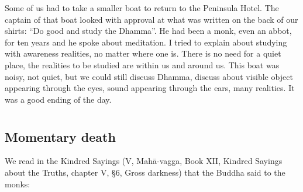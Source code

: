 Some of us had to take a smaller boat to return to the Peninsula Hotel.
The captain of that boat looked with approval at what was written on the
back of our shirts: ``Do good and study the Dhamma''. He had been a
monk, even an abbot, for ten years and he spoke about meditation. I
tried to explain about studying with awareness realities, no matter
where one is. There is no need for a quiet place, the realities to be
studied are within us and around us. This boat was noisy, not quiet, but
we could still discuss Dhamma, discuss about visible object appearing
through the eyes, sound appearing through the ears, many realities. It
was a good ending of the day.



\chapter[Momentary death]{}
\section*{Momentary death}

We read in the Kindred Sayings (V, Mahā-vagga, Book XII, Kindred Sayings
about the Truths, chapter V, §6, Gross darkness) that the Buddha said to
the monks:

